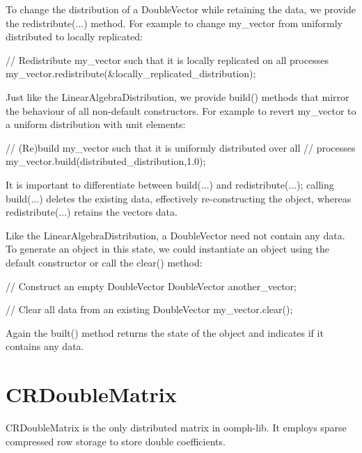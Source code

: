 To change the distribution of a {\ttfamily Double\+Vector} while retaining the data, we provide the {\ttfamily redistribute}(...) method. For example to change {\ttfamily my\+\_\+vector} from uniformly distributed to locally replicated\+:


\begin{DoxyCodeInclude}

  \textcolor{comment}{// Redistribute my\_vector such that it is locally replicated on all processes}
  my\_vector.redistribute(&locally\_replicated\_distribution);

\end{DoxyCodeInclude}


Just like the {\ttfamily Linear\+Algebra\+Distribution}, we provide {\ttfamily build()} methods that mirror the behaviour of all non-\/default constructors. For example to revert {\ttfamily my\+\_\+vector} to a uniform distribution with unit elements\+:


\begin{DoxyCodeInclude}
  
  \textcolor{comment}{// (Re)build my\_vector such that it is uniformly distributed over all}
  \textcolor{comment}{// processes}
  my\_vector.build(distributed\_distribution,1.0);

\end{DoxyCodeInclude}


It is important to differentiate between {\ttfamily build}(...) and {\ttfamily redistribute}(...); calling {\ttfamily build}(...) deletes the existing data, effectively re-\/constructing the object, whereas {\ttfamily redistribute}(...) retains the vector\textquotesingle{}s data.

Like the {\ttfamily Linear\+Algebra\+Distribution}, a {\ttfamily Double\+Vector} need not contain any data. To generate an object in this state, we could instantiate an object using the default constructor or call the {\ttfamily clear()} method\+:


\begin{DoxyCodeInclude}

  \textcolor{comment}{// Construct an empty DoubleVector}
  DoubleVector another\_vector;
  
  \textcolor{comment}{// Clear all data from an existing DoubleVector}
  my\_vector.clear();

\end{DoxyCodeInclude}


Again the {\ttfamily built()} method returns the state of the object and indicates if it contains any data.\hypertarget{index_cr_double_matrix}{}\section{C\+R\+Double\+Matrix}\label{index_cr_double_matrix}
{\ttfamily C\+R\+Double\+Matrix} is the only distributed matrix in {\ttfamily oomph-\/lib}. It employs sparse compressed row storage to store {\ttfamily double} coefficients.

